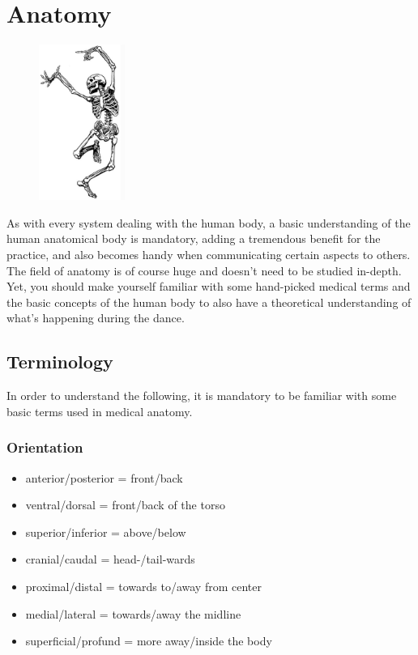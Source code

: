 \section{Anatomy}\label{sec:anatomy}

\begin{figure}
    \centering
    \includegraphics[width=0.25\textwidth]{images/anatomy}
\end{figure}

As with every system dealing with the human body, a basic understanding of the human anatomical body is mandatory, adding a tremendous benefit for the practice, and also becomes handy when communicating certain aspects to others.
The field of anatomy is of course huge and doesn't need to be studied in-depth.
Yet, you should make yourself familiar with some hand-picked medical terms and the basic concepts of the human body to also have a theoretical understanding of what's happening during the dance.

\subsection{Terminology}\label{subsec:terminology}

In order to understand the following, it is mandatory to be familiar with some basic terms used in medical anatomy.

\subsubsection{Orientation}

\begin{itemize}
    \setlength\itemsep{0em}
    \item anterior/posterior = front/back
    \item ventral/dorsal = front/back of the torso
    \item superior/inferior = above/below
    \item cranial/caudal = head-/tail-wards
    \item proximal/distal = towards to/away from center
    \item medial/lateral = towards/away the midline
    \item superficial/profund = more away/inside the body
\end{itemize}

